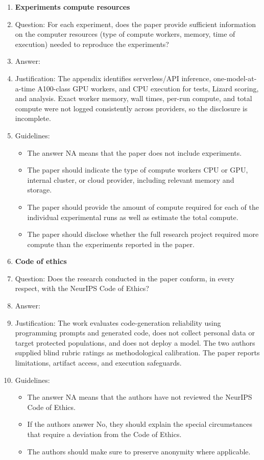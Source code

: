 \begin{enumerate}
\item {\bf Experiments compute resources}
    \item[] Question: For each experiment, does the paper provide sufficient information on the computer resources (type of compute workers, memory, time of execution) needed to reproduce the experiments?
    \item[] Answer: \answerNo{}
    \item[] Justification: The appendix identifies serverless/API inference, one-model-at-a-time A100-class GPU workers, and CPU execution for tests, Lizard scoring, and analysis. Exact worker memory, wall times, per-run compute, and total compute were not logged consistently across providers, so the disclosure is incomplete.
    \item[] Guidelines:
    \begin{itemize}
        \item The answer NA means that the paper does not include experiments.
        \item The paper should indicate the type of compute workers CPU or GPU, internal cluster, or cloud provider, including relevant memory and storage.
        \item The paper should provide the amount of compute required for each of the individual experimental runs as well as estimate the total compute.
        \item The paper should disclose whether the full research project required more compute than the experiments reported in the paper.
    \end{itemize}

\item {\bf Code of ethics}
    \item[] Question: Does the research conducted in the paper conform, in every respect, with the NeurIPS Code of Ethics?
    \item[] Answer: \answerYes{}
    \item[] Justification: The work evaluates code-generation reliability using programming prompts and generated code, does not collect personal data or target protected populations, and does not deploy a model. The two authors supplied blind rubric ratings as methodological calibration. The paper reports limitations, artifact access, and execution safeguards.
    \item[] Guidelines:
    \begin{itemize}
        \item The answer NA means that the authors have not reviewed the NeurIPS Code of Ethics.
        \item If the authors answer No, they should explain the special circumstances that require a deviation from the Code of Ethics.
        \item The authors should make sure to preserve anonymity where applicable.
    \end{itemize}


\end{enumerate}
